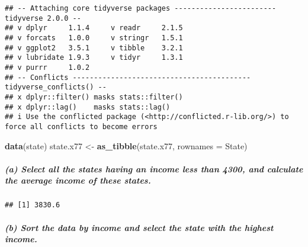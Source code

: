 \documentclass[
]{article}
\newenvironment{Shaded}{\begin{snugshade}}{\end{snugshade}}
\newcommand{\AttributeTok}[1]{\textcolor[rgb]{0.13,0.29,0.53}{#1}}
\newcommand{\CommentTok}[1]{\textcolor[rgb]{0.56,0.35,0.01}{\textit{#1}}}
\newcommand{\DecValTok}[1]{\textcolor[rgb]{0.00,0.00,0.81}{#1}}
\newcommand{\FunctionTok}[1]{\textcolor[rgb]{0.13,0.29,0.53}{\textbf{#1}}}
\newcommand{\NormalTok}[1]{#1}
\newcommand{\OtherTok}[1]{\textcolor[rgb]{0.56,0.35,0.01}{#1}}
\newcommand{\SpecialCharTok}[1]{\textcolor[rgb]{0.81,0.36,0.00}{\textbf{#1}}}
\newcommand{\StringTok}[1]{\textcolor[rgb]{0.31,0.60,0.02}{#1}}
\begin{document}
\begin{verbatim}
## -- Attaching core tidyverse packages ------------------------ tidyverse 2.0.0 --
## v dplyr     1.1.4     v readr     2.1.5
## v forcats   1.0.0     v stringr   1.5.1
## v ggplot2   3.5.1     v tibble    3.2.1
## v lubridate 1.9.3     v tidyr     1.3.1
## v purrr     1.0.2     
## -- Conflicts ------------------------------------------ tidyverse_conflicts() --
## x dplyr::filter() masks stats::filter()
## x dplyr::lag()    masks stats::lag()
## i Use the conflicted package (<http://conflicted.r-lib.org/>) to force all conflicts to become errors
\end{verbatim}

\begin{Shaded}
\begin{Highlighting}[]
\FunctionTok{data}\NormalTok{(state)}
\NormalTok{state.x77 }\OtherTok{\textless{}{-}} \FunctionTok{as\_tibble}\NormalTok{(state.x77, }\AttributeTok{rownames =} \StringTok{\textquotesingle{}State\textquotesingle{}}\NormalTok{)}
\end{Highlighting}
\end{Shaded}

\subparagraph{(a) Select all the states having an income less than 4300,
and calculate the average income of these
states.}\label{a-select-all-the-states-having-an-income-less-than-4300-and-calculate-the-average-income-of-these-states.}

\begin{Shaded}
\end{Shaded}

\begin{verbatim}
## [1] 3830.6
\end{verbatim}

\subparagraph{(b) Sort the data by income and select the state with the
highest
income.}\label{b-sort-the-data-by-income-and-select-the-state-with-the-highest-income.}
\end{document}

